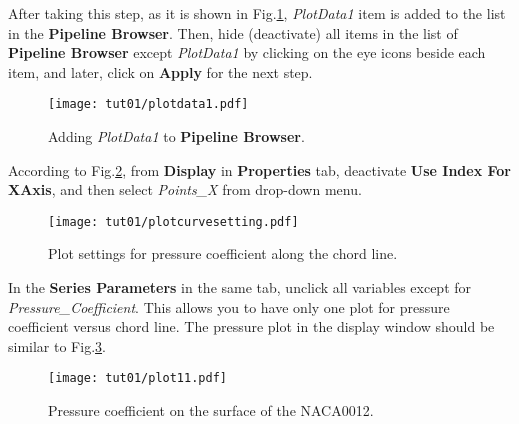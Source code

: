 After taking this step, as it is shown in Fig.\ref{fig:plotdata-list}, \textit{PlotData1} item is added to the list in the \textbf{Pipeline Browser}. Then, hide (deactivate) all items in the list of \textbf{Pipeline Browser} except \textit{PlotData1} by clicking on the eye icons beside each item, and later, click on \textbf{Apply} for the next step.
\begin{figure}[htbp]
    \centering
    \texttt{[image: tut01/plotdata1.pdf]}
    \caption{Adding \textit{PlotData1} to \textbf{Pipeline Browser}.}
    \label{fig:plotdata-list}
\end{figure}
According to Fig.\ref{fig:pointsx}, from \textbf{Display} in \textbf{Properties} tab, deactivate \textbf{Use Index For XAxis}, and then select \textit{Points\_X} from drop-down menu. 
\begin{figure}[htbp]
    \centering
    \texttt{[image: tut01/plotcurvesetting.pdf]}
    \caption{Plot settings for pressure coefficient along the chord line.}
    \label{fig:pointsx}
\end{figure}
In the \textbf{Series Parameters} in the same tab, unclick all variables except for \textit{Pressure\_Coefficient}. This allows you to have only one plot for pressure coefficient versus chord line. The pressure plot in the display window should be similar to Fig.\ref{fig:surface_pressure}.
\begin{figure}[htbp]
    \centering
    \texttt{[image: tut01/plot11.pdf]}
    \caption{Pressure coefficient on the surface of the NACA0012.}
    \label{fig:surface_pressure}
\end{figure}

